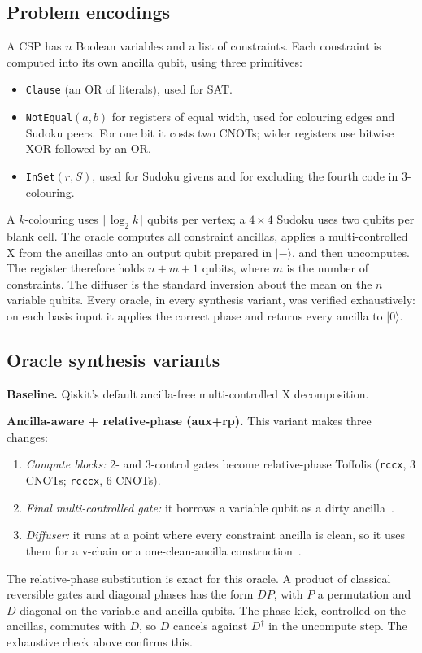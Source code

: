 \documentclass[conference]{IEEEtran}
\begin{document}
\subsection{Problem encodings}
A CSP has $n$ Boolean variables and a list of constraints. Each constraint is computed into its own ancilla qubit, using three primitives:
\begin{itemize}
\item \texttt{Clause} (an OR of literals), used for SAT.
\item \texttt{NotEqual}$(a,b)$ for registers of equal width, used for colouring edges and Sudoku peers. For one bit it costs two CNOTs; wider registers use bitwise XOR followed by an OR.
\item \texttt{InSet}$(r,S)$, used for Sudoku givens and for excluding the fourth code in 3-colouring.
\end{itemize}
A $k$-colouring uses $\lceil\log_2 k\rceil$ qubits per vertex; a $4\times4$ Sudoku uses two qubits per blank cell. The oracle computes all constraint ancillas, applies a multi-controlled X from the ancillas onto an output qubit prepared in $|-\rangle$, and then uncomputes. The register therefore holds $n+m+1$ qubits, where $m$ is the number of constraints. The diffuser is the standard inversion about the mean on the $n$ variable qubits. Every oracle, in every synthesis variant, was verified exhaustively: on each basis input it applies the correct phase and returns every ancilla to $|0\rangle$.

\subsection{Oracle synthesis variants}
\textbf{Baseline.} Qiskit's default ancilla-free multi-controlled X decomposition.

\textbf{Ancilla-aware + relative-phase (aux+rp).} This variant makes three changes:
\begin{enumerate}
\item \emph{Compute blocks:} 2- and 3-control gates become relative-phase Toffolis (\texttt{rccx}, 3 CNOTs; \texttt{rcccx}, 6 CNOTs).
\item \emph{Final multi-controlled gate:} it borrows a variable qubit as a dirty ancilla~\cite{khattar2025}.
\item \emph{Diffuser:} it runs at a point where every constraint ancilla is clean, so it uses them for a v-chain or a one-clean-ancilla construction~\cite{khattar2025}.
\end{enumerate}
The relative-phase substitution is exact for this oracle. A product of classical reversible gates and diagonal phases has the form $DP$, with $P$ a permutation and $D$ diagonal on the variable and ancilla qubits. The phase kick, controlled on the ancillas, commutes with $D$, so $D$ cancels against $D^\dagger$ in the uncompute step. The exhaustive check above confirms this.
\end{document}
